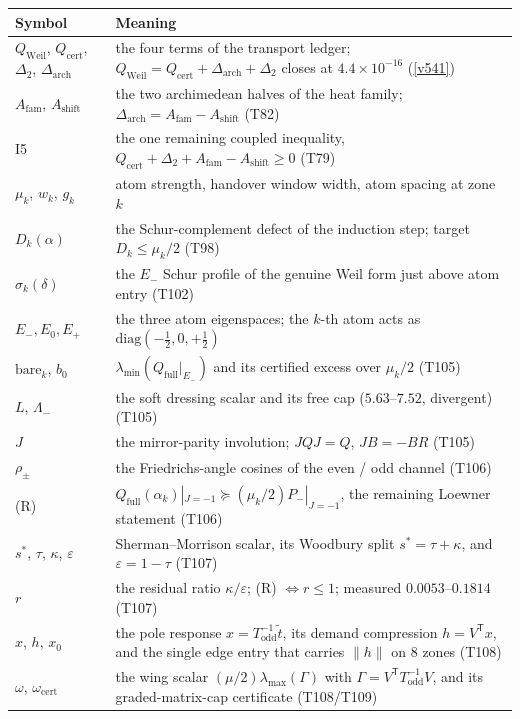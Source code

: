 \documentclass[11pt,a4paper]{article}
\newcommand{\Qcert}{Q_{\mathrm{cert}}}
\newcommand{\Afam}{A_{\mathrm{fam}}}
\newcommand{\Ashift}{A_{\mathrm{shift}}}
\newcommand{\Darch}{\Delta_{\mathrm{arch}}}
\newcommand{\Qweil}{Q_{\mathrm{Weil}}}
\newcommand{\Qfull}{Q_{\mathrm{full}}}
\begin{document}
{\small\noindent
\begin{tabularx}{\linewidth}{@{}>{\raggedright\arraybackslash}p{3.0cm} Y@{}}
\toprule
\textbf{Symbol} & \textbf{Meaning}\\
\midrule
$\Qweil$, $\Qcert$, $\Delta_2$, $\Darch$ & the four terms of the transport ledger;
$\Qweil=\Qcert+\Darch+\Delta_2$ closes at $4.4\times10^{-16}$ (\vref{v541})\\
$\Afam$, $\Ashift$ & the two archimedean halves of the heat family; $\Darch=\Afam-\Ashift$ (T82)\\
I5 & the one remaining coupled inequality, $\Qcert+\Delta_2+\Afam-\Ashift\ge0$ (T79)\\
$\mu_k$, $w_k$, $g_k$ & atom strength, handover window width, atom spacing at zone $k$\\
$D_k(\alpha)$ & the Schur-complement defect of the induction step; target $D_k\le\mu_k/2$ (T98)\\
$\sigma_k(\delta)$ & the $E_-$ Schur profile of the genuine Weil form just above atom entry (T102)\\
$E_-,E_0,E_+$ & the three atom eigenspaces; the $k$-th atom acts as $\mathrm{diag}(-\tfrac12,0,+\tfrac12)$\\
$\mathrm{bare}_k$, $b_0$ & $\lambda_{\min}(\Qfull|_{E_-})$ and its certified excess over $\mu_k/2$ (T105)\\
$L$, $\Lambda_-$ & the soft dressing scalar and its free cap ($5.63$--$7.52$, divergent) (T105)\\
$J$ & the mirror-parity involution; $JQJ=Q$, $JB=-BR$ (T105)\\
$\rho_\pm$ & the Friedrichs-angle cosines of the even / odd channel (T106)\\
(R) & $\Qfull(\alpha_k)|_{J=-1}\succeq(\mu_k/2)P_-|_{J=-1}$, the remaining Loewner statement (T106)\\
$s^*$, $\tau$, $\kappa$, $\varepsilon$ & Sherman--Morrison scalar, its Woodbury split
$s^*=\tau+\kappa$, and $\varepsilon=1-\tau$ (T107)\\
$r$ & the residual ratio $\kappa/\varepsilon$; (R) $\iff r\le1$; measured $0.0053$--$0.1814$ (T107)\\
$x$, $h$, $x_0$ & the pole response $x=T_{\mathrm{odd}}^{-1}\tilde t$, its demand compression
$h=V^{\mathsf T}x$, and the single edge entry that carries $\|h\|$ on $8$ zones (T108)\\
$\omega$, $\omega_{\mathrm{cert}}$ & the wing scalar $(\mu/2)\lambda_{\max}(\Gamma)$ with
$\Gamma=V^{\mathsf T}T_{\mathrm{odd}}^{-1}V$, and its graded-matrix-cap certificate (T108/T109)\\

\end{tabularx}}
\end{document}

